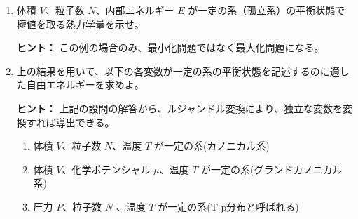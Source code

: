 \documentclass[uplatex,dvipdfmx,a4paper,11pt]{jsarticle}
\begin{document}
\begin{enumerate}
\setlength{\parskip}{0cm} %
\setlength{\itemsep}{0.5cm} %
\item
体積 $V$、粒子数 $N$、内部エネルギー $E$ が一定の系（孤立系）の平衡状態で極値を取る熱力学量を示せ。

\begin{itembox}[l]{{\bf ヒント：}}
この例の場合のみ、最小化問題ではなく最大化問題になる。
\end{itembox}


\item
上の結果を用いて、以下の各変数が一定の系の平衡状態を記述するのに適した自由エネルギーを求めよ。

\begin{itembox}[l]{{\bf ヒント：}}
上記の設問の解答から、ルジャンドル変換により、独立な変数を変換すれば導出できる。
\end{itembox}

\begin{enumerate}
\item
体積 $V$、粒子数 $N$、温度 $T$ が一定の系(カノニカル系)

\item
体積 $V$、化学ポテンシャル $\mu$、温度 $T$ が一定の系(グランドカノニカル系)
\item
圧力 $P$、粒子数 $N$ 、温度 $T$ が一定の系(T-p分布と呼ばれる)

\end{enumerate}

\end{enumerate}

\newpage
\end{document}
